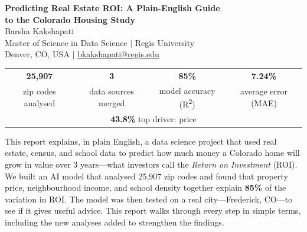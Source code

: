 \documentclass[12pt, a4paper]{article}
\begin{document}
\begin{center}
    {\LARGE\bfseries\color{darkblue}
        Predicting Real Estate ROI: A Plain-English Guide\\[4pt]
        to the Colorado Housing Study}\\[10pt]
    {\large Barsha Kakshapati}\\[4pt]
    {\normalsize Master of Science in Data Science $\mid$ Regis University}\\
    {\normalsize Denver, CO, USA $\mid$ \href{mailto:bkakshapati@regis.edu}{bkakshapati@regis.edu}}
\end{center}

\vspace{6pt}

\begin{tcolorbox}[
    colback=rowblue, colframe=headerblue,
    title={\bfseries\color{white} Key Metrics at a Glance},
    coltitle=white,
    fonttitle=\bfseries,
    arc=4pt
]
\begin{center}
\begin{tabular}{cccc}
    \textbf{\large 25,907} & \textbf{\large 3} & \textbf{\large 85\%} & \textbf{\large 7.24\%} \\
    zip codes analysed & data sources merged & model accuracy (R\textsuperscript{2}) & average error (MAE) \\[6pt]
    \multicolumn{4}{c}{\textbf{\large 43.8\%} \quad top driver: price} \\
\end{tabular}
\end{center}
\end{tcolorbox}

\begin{tcolorbox}[colback=lightgray, colframe=medgray, arc=4pt, title=\textbf{Abstract}, fonttitle=\bfseries]
This report explains, in plain English, a data science project that used real estate, census, and school data to
predict how much money a Colorado home will grow in value over 3 years---what investors call the
\textit{Return on Investment} (ROI). We built an AI model that analysed 25,907 zip codes and found that property
price, neighbourhood income, and school density together explain \textbf{85\%} of the variation in ROI.
The model was then tested on a real city---Frederick, CO---to see if it gives useful advice. This report walks
through every step in simple terms, including the new analyses added to strengthen the findings.
\end{tcolorbox}
\end{document}
